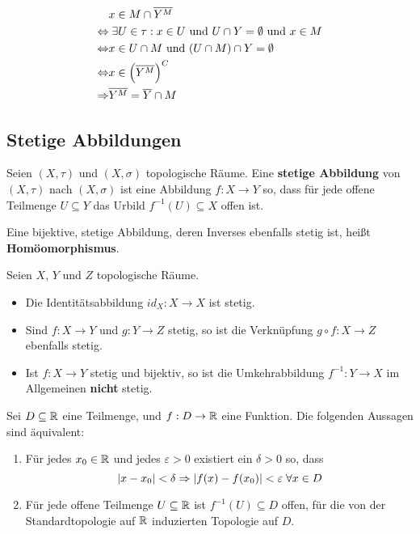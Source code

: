 \documentclass[main.tex]{subfiles}
\begin{document}
\begin{Beweis}
  $$\begin{aligned}
    & x \in M \cap \overline{Y^M} \\
    \Leftrightarrow & \;\exists U \in \tau : x \in U \text{ und } U \cap Y = \emptyset \text{ und } x \in M \\
    \Leftrightarrow & x \in U \cap M \text{ und } (U \cap M) \cap Y = \emptyset \\
    \Leftrightarrow & x \in \left(\overline{Y^M}\right)^C \\
    \Rightarrow & \overline{Y^M} = \overline{Y} \cap M
  \end{aligned}$$
\end{Beweis}


\subsection{Stetige Abbildungen}

\begin{Definition}[Homöomorphismus]
  Seien $(X,\tau)$ und $(X,\sigma)$ topologische Räume. Eine \textbf{stetige Abbildung} von $(X,\tau)$ nach $(X,\sigma)$ ist eine Abbildung $f: X \to Y$ so, dass für jede offene Teilmenge $U \subseteq Y$ das Urbild $f^{-1}(U) \subseteq X$ offen ist.

  Eine bijektive, stetige Abbildung, deren Inverses ebenfalls stetig ist, heißt \textbf{Homöomorphismus}.
\end{Definition}

\begin{Theorem}
  Seien $X$, $Y$ und $Z$ topologische Räume.
  \begin{itemize}
    \item Die Identitätsabbildung $id_X : X \to X$ ist stetig.
    \item Sind $f: X \to Y$ und $g: Y \to Z$ stetig, so ist die Verknüpfung $g \circ f : X \to Z$ ebenfalls stetig.
    \item Ist $f : X \to Y$ stetig und bijektiv, so ist die Umkehrabbildung $f^{-1}: Y \to X$ im Allgemeinen \textbf{nicht} stetig.
  \end{itemize}
\end{Theorem}

\begin{Theorem}
  Sei $D \subseteq \mathbb{R}$ eine Teilmenge, und $f: D \to \mathbb{R}$ eine Funktion. Die folgenden Aussagen sind äquivalent:
  \begin{enumerate}
    \item Für jedes $x_0 \in \mathbb{R}$ und jedes $\varepsilon > 0$ existiert ein $\delta > 0$ so, dass
      $$|x - x_0| < \delta \Rightarrow |f(x) - f(x_0)| < \varepsilon \;\forall x \in D$$
    \item Für jede offene Teilmenge $U \subseteq \mathbb{R}$ ist $f^{-1}(U) \subseteq D$ offen, für die von der Standardtopologie auf $\mathbb{R}$ induzierten Topologie auf $D$.
  \end{enumerate}
\end{Theorem}
\end{document}
